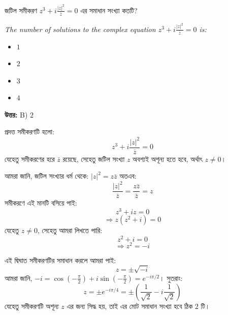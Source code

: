 \documentclass[12pt, a4paper]{article}
\begin{document}
\begin{tcolorbox}[questionbox={প্রশ্ন (Question) 6}]
    \noindent
    জটিল সমীকরণ $z^3 + i \frac{|z|^2}{\bar{z}} = 0$ এর সমাধান সংখ্যা কতটি?
    
    \vspace{0.8em}
    \begin{english}
    \noindent\textit{\color{darkgray}
    The number of solutions to the complex equation $z^3 + i \frac{|z|^2}{\bar{z}} = 0$ is:
    }
    \end{english}
\end{tcolorbox}

\begin{itemize}[label={}, leftmargin=1cm, itemsep=0.5em]
    \item[\textbf{A)}] $1$
    \item[\textbf{B)}] $2$
    \item[\textbf{C)}] $3$
    \item[\textbf{D)}] $4$
\end{itemize}

\vspace{0.5em}
\begin{tcolorbox}[answerbox]
    \textbf{\color{success} উত্তর:} B) $2$
\end{tcolorbox}
\vspace{1em}

\begin{tcolorbox}[solutionbox={সমাধান (Solution)}]
    \noindent
    প্রদত্ত সমীকরণটি হলো:
    \[ z^3 + i \frac{|z|^2}{\bar{z}} = 0 \]
    যেহেতু সমীকরণের হরে $\bar{z}$ রয়েছে, সেহেতু জটিল সংখ্যা $z$ অবশ্যই অশূন্য হতে হবে, অর্থাৎ $z \neq 0$। 
    
    \vspace{0.5em}
    আমরা জানি, জটিল সংখ্যার ধর্ম থেকে: $|z|^2 = z \bar{z}$ 
    অতএব:
    \[ \frac{|z|^2}{\bar{z}} = \frac{z \bar{z}}{\bar{z}} = z \]
    সমীকরণে এই মানটি বসিয়ে পাই:
    \[ z^3 + i z = 0 \]
    \[ \Rightarrow z(z^2 + i) = 0 \]
    যেহেতু $z \neq 0$, সেহেতু আমরা লিখতে পারি:
    \[ z^2 + i = 0 \]
    \[ \Rightarrow z^2 = -i \]
    
    \vspace{0.5em}
    এই দ্বিঘাত সমীকরণটির সমাধান করলে আমরা পাই:
    \[ z = \pm \sqrt{-i} \]
    আমরা জানি, $-i = \cos\left(-\frac{\pi}{2}\right) + i\sin\left(-\frac{\pi}{2}\right) = e^{-i\pi/2}$। সুতরাং:
    \[ z = \pm e^{-i\pi/4} = \pm \left(\frac{1}{\sqrt{2}} - i\frac{1}{\sqrt{2}}\right) \]
    যেহেতু সমীকরণটি অশূন্য $z$ এর জন্য সিদ্ধ হয়, তাই এর মোট সমাধান সংখ্যা হবে ঠিক $2$ টি।
\end{tcolorbox}
\end{document}
